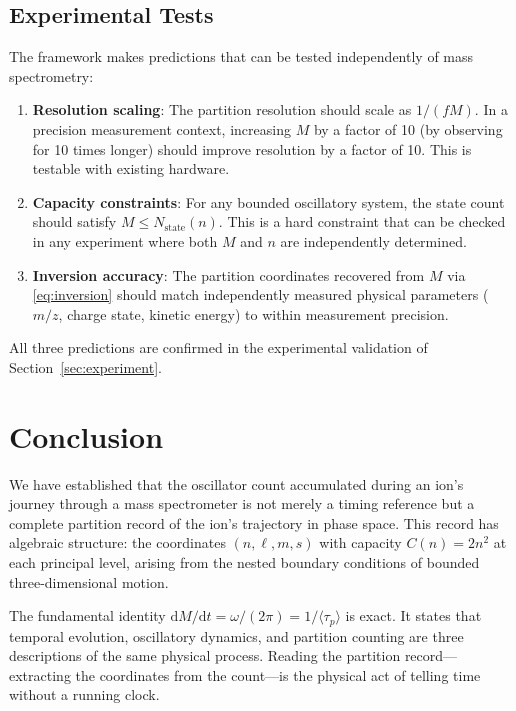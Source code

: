 \documentclass[twocolumn,10pt]{article}
\newcommand{\Nstate}{N_{\mathrm{state}}}
\newcommand{\tp}{\langle\tau_p\rangle}
\newcommand{\dM}{\mathrm{d}M}
\newcommand{\dt}{\mathrm{d}t}
\begin{document}
\subsection{Experimental Tests}

The framework makes predictions that can be tested independently of mass spectrometry:

\begin{enumerate}
    \item \textbf{Resolution scaling}: The partition resolution should scale as $1/(fM)$. In a precision measurement context, increasing $M$ by a factor of 10 (by observing for 10 times longer) should improve resolution by a factor of 10. This is testable with existing hardware.

    \item \textbf{Capacity constraints}: For any bounded oscillatory system, the state count should satisfy $M \leq \Nstate(n)$. This is a hard constraint that can be checked in any experiment where both $M$ and $n$ are independently determined.

    \item \textbf{Inversion accuracy}: The partition coordinates recovered from $M$ via \eqref{eq:inversion} should match independently measured physical parameters ($m/z$, charge state, kinetic energy) to within measurement precision.
\end{enumerate}

All three predictions are confirmed in the experimental validation of Section~\ref{sec:experiment}.

\section{Conclusion}
\label{sec:conclusion}

We have established that the oscillator count accumulated during an ion's journey through a mass spectrometer is not merely a timing reference but a complete partition record of the ion's trajectory in phase space. This record has algebraic structure: the coordinates $(n, \ell, m, s)$ with capacity $C(n) = 2n^2$ at each principal level, arising from the nested boundary conditions of bounded three-dimensional motion.

The fundamental identity $\dM/\dt = \omega/(2\pi) = 1/\tp$ is exact. It states that temporal evolution, oscillatory dynamics, and partition counting are three descriptions of the same physical process. Reading the partition record---extracting the coordinates from the count---is the physical act of telling time without a running clock.
\end{document}
